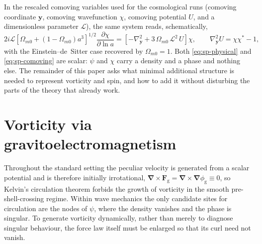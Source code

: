 \documentclass[11pt,a4paper]{article}
\newcommand{\grad}{\bm{\nabla}}
\begin{document}
In the rescaled comoving variables used for the cosmological runs (comoving coordinate
$\mathbf{y}$, comoving wavefunction $\chi$, comoving potential $U$, and a dimensionless
parameter $\mathcal{L}$), the same system reads, schematically,
%
\begin{equation}
  2 i \mathcal{L}\left[\Omega_{m0} + (1-\Omega_{m0})a^3\right]^{1/2}
  \frac{\partial \chi}{\partial \ln a}
  = \left[ -\nabla_{\mathbf{y}}^2 + 3\,\Omega_{m0}\,\mathcal{L}^2\,U \right]\chi,
  \qquad
  \nabla_{\mathbf{y}}^2 U = \chi\chi^{\ast} - 1 ,
  \label{eq:sp-comoving}
\end{equation}
%
with the Einstein--de~Sitter case recovered by $\Omega_{m0}=1$. Both
\eqref{eq:sp-physical} and \eqref{eq:sp-comoving} are scalar: $\psi$ and $\chi$ carry a
density and a phase and nothing else. The remainder of this paper asks what minimal
additional structure is needed to represent vorticity and spin, and how to add it
without disturbing the parts of the theory that already work.

\section{Vorticity via gravitoelectromagnetism}
\label{sec:vorticity}

Throughout the standard setting the peculiar velocity is generated from a scalar
potential and is therefore initially irrotational,
$\grad\times\mathbf{F}_{\mathrm{g}} = \grad\times\grad\phi_{\mathrm{g}} \equiv 0$, so
Kelvin's circulation theorem forbids the growth of vorticity in the smooth
pre-shell-crossing regime. Within wave mechanics the only candidate sites for
circulation are the nodes of $\psi$, where the density vanishes and the phase is
singular. To generate vorticity dynamically, rather than merely to diagnose singular
behaviour, the force law itself must be enlarged so that its curl need not vanish.
\end{document}
